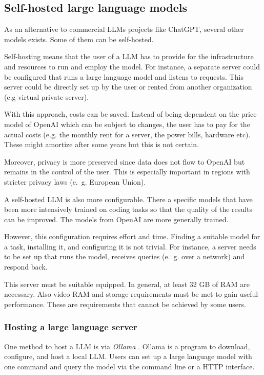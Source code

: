 \subsection{Self-hosted large language models}

As an alternative to commercial  \ac{LLM}s projects like ChatGPT, several other models exists. Some of them can be self-hosted.  

Self-hosting means that the user of a \ac{LLM} has to provide for the infrastructure and resources to run and employ the model. For instance, a separate server could be configured that runs a large language model and listens to requests. This server could be directly set up by the user or rented from another organization (e.g virtual private server). 

With this approach, costs can be saved. Instead of being dependent on the price model of OpenAI which can be subject to changes, the user has to pay for the actual costs (e.g. the monthly rent for a server, the power bills, hardware etc). These might amortize after some years but this is not certain.

Moreover, privacy is more preserved since data does not flow to OpenAI but remains in the control of the user. This is especially important in regions with stricter privacy laws (e.~g. European Union).

A self-hosted \ac{LLM} is also more configurable. There a specific models that have been more intensively trained on coding tasks so that the quality of the results can be improved. The models from OpenAI are more generally trained. 

However, this configuration requires effort and time. Finding a suitable model for a task, installing it, and configuring it is not trivial. For instance, a server needs to be set up that  runs the model, receives queries (e.~g. over a network) and respond back. 

This server must be suitable equipped. In general, at least 32 GB of RAM are necessary. Also video RAM and storage requirements must be met to gain useful performance. These are requirements that cannot be achieved by some users. 

\subsubsection{Hosting a large language server}

One method to host a \ac{LLM} is via \textit{Ollama} \cite{ollama}. Ollama is a program to download, configure, and host a local \ac{LLM}. Users can set up a large language model with one command and query the model via the command line or a \ac{HTTP} interface.


